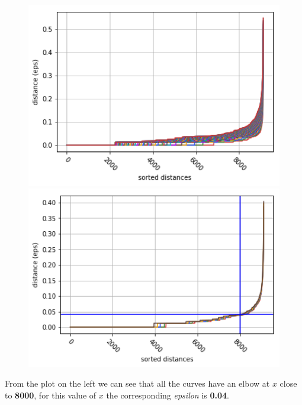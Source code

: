 \begin{figure}[h]
  \begin{minipage}[h]{.50\textwidth}
    \includegraphics[width=1\textwidth]{img/ch3/dbscan_eps}
  \end{minipage}
  \begin{minipage}[h]{.50\textwidth}    
    \includegraphics[width=1\textwidth]{img/ch3/dbscan_eps2}
  \end{minipage}
\end{figure}

From the plot on the left we can see that all the curves have an elbow at $x$ close to \textbf{8000}, for this value of $x$ the corresponding \textit{epsilon} is \textbf{0.04}.

\medskip

